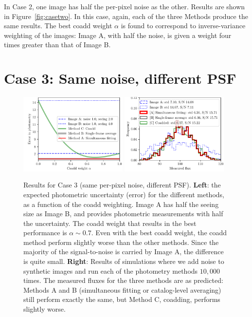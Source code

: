 \documentclass[letter,11pt]{article}
\begin{document}
In Case 2, one image has half the per-pixel noise as the other.
Results are shown in Figure~\ref{fig:casetwo}.  In this case, again,
each of the three Methods produce the same results.  The best coadd
weight $\alpha$ is found to correspond to inverse-variance weighting
of the images: Image A, with half the noise, is given a weight four
times greater than that of Image B.



\section*{Case 3: Same noise, different PSF}

\begin{figure}[h!]
  \begin{center}
    \includegraphics[width=0.48\textwidth]{coadd-04}
    \includegraphics[width=0.48\textwidth]{coadd-05}
  \end{center}
  \caption{Results for Case 3 (same per-pixel noise, different PSF).
    \textbf{Left}: the expected photometric uncertainty (error) for
    the different methods, as a function of the coadd weighting.
    Image A has half the seeing size as Image B, and provides
    photometric measurements with half the uncertainty.  The coadd
    weight that results in the best performance is $\alpha \sim 0.7$.
    Even with the best coadd weight, the coadd method perform slightly
    worse than the other methods.  Since the majority of the
    signal-to-noise is carried by Image A, the difference is quite
    small.
    \newline \textbf{Right}: Results of simulations where we add noise
    to synthetic images and run each of the photometry methods
    $10,000$ times.  The measured fluxes for the three methods are as
    predicted: Methods A and B (simultaneous fitting or catalog-level
    averaging) still perform exactly the same, but Method C, coadding,
    performs slightly worse.
    \label{fig:casethree}}
\end{figure}
\end{document}
